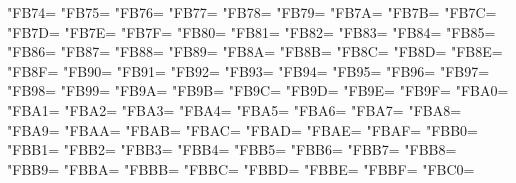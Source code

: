 \XeTeXcharclass"FB74=\KclassArabU
\XeTeXcharclass"FB75=\KclassArabU
\XeTeXcharclass"FB76=\KclassArabU
\XeTeXcharclass"FB77=\KclassArabU
\XeTeXcharclass"FB78=\KclassArabU
\XeTeXcharclass"FB79=\KclassArabU
\XeTeXcharclass"FB7A=\KclassArabU
\XeTeXcharclass"FB7B=\KclassArabU
\XeTeXcharclass"FB7C=\KclassArabU
\XeTeXcharclass"FB7D=\KclassArabU
\XeTeXcharclass"FB7E=\KclassArabU
\XeTeXcharclass"FB7F=\KclassArabU
\XeTeXcharclass"FB80=\KclassArabU
\XeTeXcharclass"FB81=\KclassArabU
\XeTeXcharclass"FB82=\KclassArabU
\XeTeXcharclass"FB83=\KclassArabU
\XeTeXcharclass"FB84=\KclassArabU
\XeTeXcharclass"FB85=\KclassArabU
\XeTeXcharclass"FB86=\KclassArabU
\XeTeXcharclass"FB87=\KclassArabU
\XeTeXcharclass"FB88=\KclassArabU
\XeTeXcharclass"FB89=\KclassArabU
\XeTeXcharclass"FB8A=\KclassArabU
\XeTeXcharclass"FB8B=\KclassArabU
\XeTeXcharclass"FB8C=\KclassArabU
\XeTeXcharclass"FB8D=\KclassArabU
\XeTeXcharclass"FB8E=\KclassArabU
\XeTeXcharclass"FB8F=\KclassArabU
\XeTeXcharclass"FB90=\KclassArabU
\XeTeXcharclass"FB91=\KclassArabU
\XeTeXcharclass"FB92=\KclassArabU
\XeTeXcharclass"FB93=\KclassArabU
\XeTeXcharclass"FB94=\KclassArabU
\XeTeXcharclass"FB95=\KclassArabU
\XeTeXcharclass"FB96=\KclassArabU
\XeTeXcharclass"FB97=\KclassArabU
\XeTeXcharclass"FB98=\KclassArabU
\XeTeXcharclass"FB99=\KclassArabU
\XeTeXcharclass"FB9A=\KclassArabU
\XeTeXcharclass"FB9B=\KclassArabU
\XeTeXcharclass"FB9C=\KclassArabU
\XeTeXcharclass"FB9D=\KclassArabU
\XeTeXcharclass"FB9E=\KclassArabU
\XeTeXcharclass"FB9F=\KclassArabU
\XeTeXcharclass"FBA0=\KclassArabU
\XeTeXcharclass"FBA1=\KclassArabU
\XeTeXcharclass"FBA2=\KclassArabU
\XeTeXcharclass"FBA3=\KclassArabU
\XeTeXcharclass"FBA4=\KclassArabU
\XeTeXcharclass"FBA5=\KclassArabU
\XeTeXcharclass"FBA6=\KclassArabU
\XeTeXcharclass"FBA7=\KclassArabU
\XeTeXcharclass"FBA8=\KclassArabU
\XeTeXcharclass"FBA9=\KclassArabU
\XeTeXcharclass"FBAA=\KclassArabU
\XeTeXcharclass"FBAB=\KclassArabU
\XeTeXcharclass"FBAC=\KclassArabU
\XeTeXcharclass"FBAD=\KclassArabU
\XeTeXcharclass"FBAE=\KclassArabU
\XeTeXcharclass"FBAF=\KclassArabU
\XeTeXcharclass"FBB0=\KclassArabU
\XeTeXcharclass"FBB1=\KclassArabU
\XeTeXcharclass"FBB2=\KclassArabU
\XeTeXcharclass"FBB3=\KclassArabU
\XeTeXcharclass"FBB4=\KclassArabU
\XeTeXcharclass"FBB5=\KclassArabU
\XeTeXcharclass"FBB6=\KclassArabU
\XeTeXcharclass"FBB7=\KclassArabU
\XeTeXcharclass"FBB8=\KclassArabU
\XeTeXcharclass"FBB9=\KclassArabU
\XeTeXcharclass"FBBA=\KclassArabU
\XeTeXcharclass"FBBB=\KclassArabU
\XeTeXcharclass"FBBC=\KclassArabU
\XeTeXcharclass"FBBD=\KclassArabU
\XeTeXcharclass"FBBE=\KclassArabU
\XeTeXcharclass"FBBF=\KclassArabU
\XeTeXcharclass"FBC0=\KclassArabU

